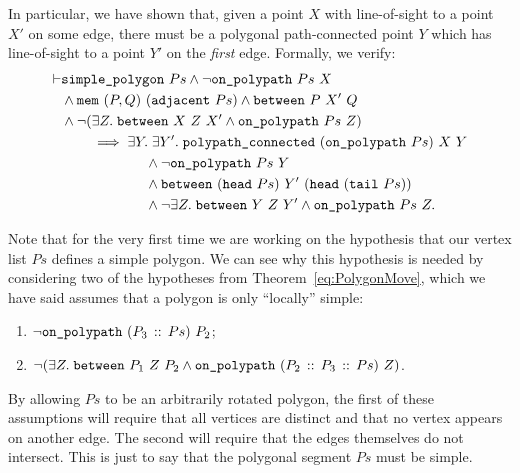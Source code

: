 In particular, we have shown that, given a point $X$ with line-of-sight to a point $X'$ on some edge, there must be a polygonal path-connected point $Y$ which has line-of-sight to a point $Y'$ on the \emph{first} edge. Formally, we verify:
\begin{equation*}
  \begin{split}
\vdash    &\texttt{simple\_polygon}\ Ps \wedge \neg\texttt{on\_polypath}\ Ps\ X\\
    &\wedge \texttt{mem}\ (P,Q)\ (\texttt{adjacent}\ Ps) \wedge \texttt{between}\ P\ X'\ Q\\
    &\wedge\neg(\exists Z.\; \texttt{between}\ X\ Z\ X' \wedge \texttt{on\_polypath}\ Ps\ Z)\\
    &\qquad\implies \exists Y.\;\exists Y'.\; \texttt{polypath\_connected}\ (\texttt{on\_polypath}\ Ps)\ X\ Y\\
    &\qquad\qquad\qquad\wedge\neg\texttt{on\_polypath}\ Ps\ Y\\
    &\qquad\qquad\qquad\wedge \texttt{between}\ (\texttt{head}\ Ps)\ Y'\ (\texttt{head}\ (\texttt{tail}\ Ps))\\
    &\qquad\qquad\qquad\wedge \neg\exists Z.\; \texttt{between}\ Y\ Z\ Y' \wedge \texttt{on\_polypath}\ Ps\ Z.
  \end{split}
\end{equation*}

Note that for the very first time we are working on the hypothesis that our vertex list $Ps$ defines a simple polygon. We can see why this hypothesis is needed by considering two of the hypotheses from Theorem~\ref{eq:PolygonMove}, which we have said assumes that a polygon is only ``locally'' simple:
\begin{enumerate}
\item $\neg\texttt{on\_polypath}\ (P_3\,::\,Ps)\ P_2$;
\item $\neg(\exists Z.\; \texttt{between}\ P_1\ Z\ P_2 \wedge \texttt{on\_polypath}\ (P_2\,::\,P_3\,::\,Ps)\ Z)$.
\end{enumerate}

By allowing $Ps$ to be an arbitrarily rotated polygon, the first of these assumptions will require that all vertices are distinct and that no vertex appears on another edge. The second will require that the edges themselves do not intersect. This is just to say that the polygonal segment $Ps$ must be simple.

